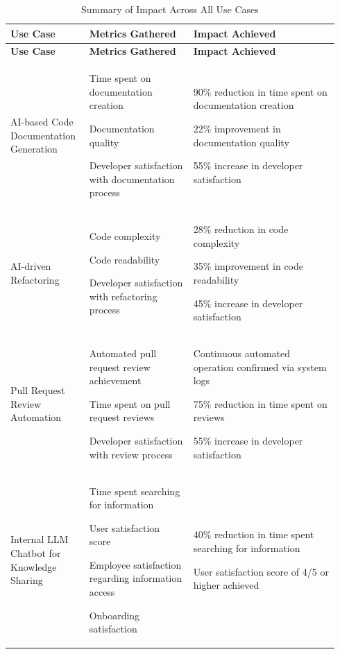 \documentclass[]{imc-inf}
\begin{document}
\begin{longtable}{|p{0.22\linewidth}|p{0.30\linewidth}|p{0.42\linewidth}|}
	\hline
	\textbf{Use Case} & \textbf{Metrics Gathered} & \textbf{Impact Achieved} \\
	\hline
	\endfirsthead
	
	\hline
	\textbf{Use Case} & \textbf{Metrics Gathered} & \textbf{Impact Achieved} \\
	\hline
	\endhead
	
	\hline
	\caption{Summary of Impact Across All Use Cases}
	\label{tab:summary_impact}
	\endlastfoot
	
	AI-based Code Documentation Generation &
	Time spent on documentation creation
	
	Documentation quality
	
	Developer satisfaction with documentation process &
	90\% reduction in time spent on documentation creation
	
	22\% improvement in documentation quality
	
	55\% increase in developer satisfaction \\
	\hline
	
	AI-driven Refactoring &
	Code complexity
	
	Code readability
	
	Developer satisfaction with refactoring process &
	28\% reduction in code complexity
	
	35\% improvement in code readability
	
	45\% increase in developer satisfaction \\
	\hline
	
	Pull Request Review Automation &
	Automated pull request review achievement
	
	Time spent on pull request reviews
	
	Developer satisfaction with review process &
	Continuous automated operation confirmed via system logs
	
	75\% reduction in time spent on reviews
	
	55\% increase in developer satisfaction \\
	\hline
	
	Internal LLM Chatbot for Knowledge Sharing &
	Time spent searching for information
	
	User satisfaction score
	
	Employee satisfaction regarding information access
	
	Onboarding satisfaction &
	40\% reduction in time spent searching for information
	
	User satisfaction score of 4/5 or higher achieved \\
	\hline
\end{longtable}
\end{document}
